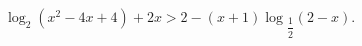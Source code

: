 \begin{ex}[type=inequality]
	\begin{condition}
		$\log_2(x^2 - 4x + 4) + 2x>2 - (x + 1)\log$\tiny$_{\dfrac{1}{2}}$\normalsize$(2 - x)  .$
	\end{condition}
\end{ex}